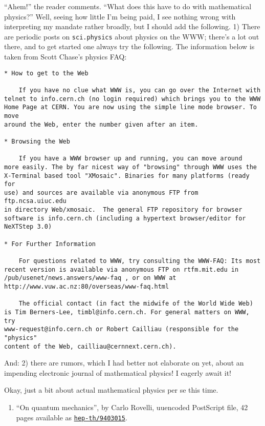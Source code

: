 \documentclass{article}
\def\tightlist{}
\begin{document}
``Ahem!'' the reader comments. ``What does this have to do with
mathematical physics?'' Well, seeing how little I'm being paid, I see
nothing wrong with interpreting my mandate rather broadly, but I should
add the following. 1) There are periodic posts on \texttt{sci.physics}
about physics on the WWW; there's a lot out there, and to get started
one always try the following. The information below is taken from Scott
Chase's physics FAQ:

\begin{verbatim}
* How to get to the Web

    If you have no clue what WWW is, you can go over the Internet with
telnet to info.cern.ch (no login required) which brings you to the WWW 
Home Page at CERN. You are now using the simple line mode browser. To move 
around the Web, enter the number given after an item. 

* Browsing the Web

    If you have a WWW browser up and running, you can move around
more easily. The by far nicest way of "browsing" through WWW uses the
X-Terminal based tool "XMosaic". Binaries for many platforms (ready for
use) and sources are available via anonymous FTP from ftp.ncsa.uiuc.edu
in directory Web/xmosaic.  The general FTP repository for browser
software is info.cern.ch (including a hypertext browser/editor for
NeXTStep 3.0)

* For Further Information

    For questions related to WWW, try consulting the WWW-FAQ: Its most 
recent version is available via anonymous FTP on rtfm.mit.edu in 
/pub/usenet/news.answers/www-faq , or on WWW at 
http://www.vuw.ac.nz:80/overseas/www-faq.html

    The official contact (in fact the midwife of the World Wide Web) 
is Tim Berners-Lee, timbl@info.cern.ch. For general matters on WWW, try 
www-request@info.cern.ch or Robert Cailliau (responsible for the "physics" 
content of the Web, cailliau@cernnext.cern.ch).
\end{verbatim}

And: 2) there are rumors, which I had better not elaborate on yet, about
an impending electronic journal of mathematical physics! I eagerly await
it!

Okay, just a bit about actual mathematical physics per se this time.

\begin{enumerate}
\def\labelenumi{\arabic{enumi})}
\tightlist
\item
  ``On quantum mechanics'', by Carlo Rovelli, uuencoded PostScript file,
  42 pages available as
  \href{http://xxx.lanl.gov/abs/hep-th/9403015}{\texttt{hep-th/9403015}}.
\end{enumerate}
\end{document}
